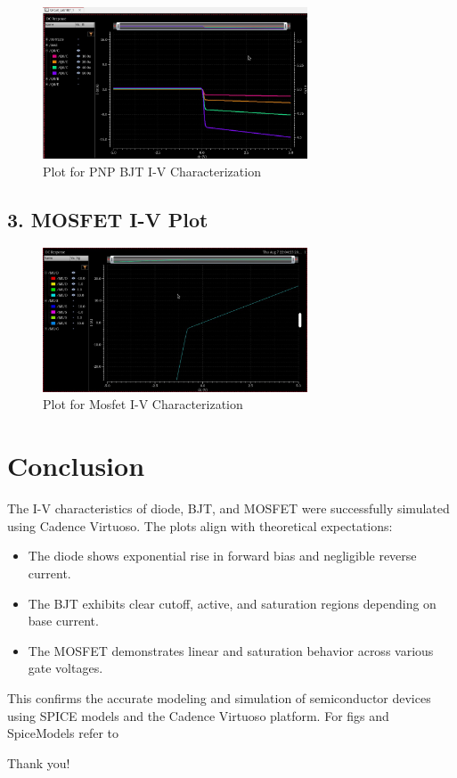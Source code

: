 \documentclass[12pt,a4paper]{article}
\begin{document}
\begin{figure}[H]
    \centering
    \includegraphics[width=0.7\textwidth]{figs/BJT/PNP/Plot.jpg} %
    \caption{Plot for PNP BJT I-V Characterization}
\end{figure}

\subsection*{3. MOSFET I-V Plot}
\begin{figure}[H]
    \centering
    \includegraphics[width=0.7\textwidth]{figs/Mosfet/Plot.jpg} %
    \caption{Plot for Mosfet I-V Characterization}
\end{figure}

\section*{Conclusion}
The I-V characteristics of diode, BJT, and MOSFET were successfully simulated using Cadence Virtuoso. The plots align with theoretical expectations:

\begin{itemize}
    \item The diode shows exponential rise in forward bias and negligible reverse current.
    \item The BJT exhibits clear cutoff, active, and saturation regions depending on base current.
    \item The MOSFET demonstrates linear and saturation behavior across various gate voltages.
\end{itemize}

This confirms the accurate modeling and simulation of semiconductor devices using SPICE models and the Cadence Virtuoso platform.
For figs and SpiceModels refer to
\url{}


\centering Thank you!
\end{document}
